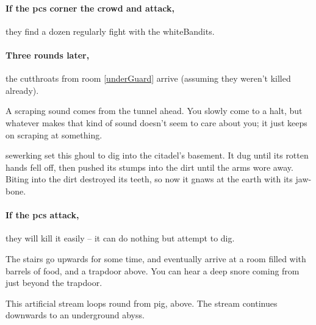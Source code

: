 \paragraph{If the \glspl{pc} corner the crowd and attack,}
they find a dozen regularly fight with the \gls{whiteBandits}.

\sewerking



\paragraph{Three rounds later,}
the cutthroats from room \ref{underGuard} arrive (assuming they weren't killed already).

\begin{boxtext}
  A scraping sound comes from the tunnel ahead.
  You slowly come to a halt, but whatever makes that kind of sound doesn't seem to care about you; it just keeps on scraping at something.
\end{boxtext}
 

\begin{exampletext}
  \Gls{sewerking} set this ghoul to dig into the citadel's basement.
  It dug until its rotten hands fell off, then pushed its stumps into the dirt until the arms wore away.
  Biting into the dirt destroyed its teeth, so now it gnaws at the earth with its jaw-bone.
\end{exampletext}

\paragraph{If the \glspl{pc} attack,}
they will kill it easily -- it can do nothing but attempt to dig.

\begin{boxtext}

  The stairs go upwards for some time, and eventually arrive at a room filled with barrels of food, and a trapdoor above.
  You can hear a deep snore coming from just beyond the trapdoor.

\end{boxtext}

This artificial stream loops round from \gls{pig}, above.
The stream continues downwards to an underground abyss.

